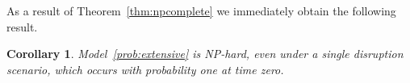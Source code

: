 \documentclass[11pt]{article}
\newtheorem{corollary}[theorem]{Corollary}
\newcommand{\noi}{\noindent}
\begin{document}
	\noi
	As a result of Theorem~\ref{thm:npcomplete} we immediately obtain the following result.
	\begin{corollary} \label{thm:nphard}
		Model~\eqref{prob:extensive} is NP-hard, even under a single disruption scenario, which occurs with probability one at time zero.
	\end{corollary}
	
\end{document}
